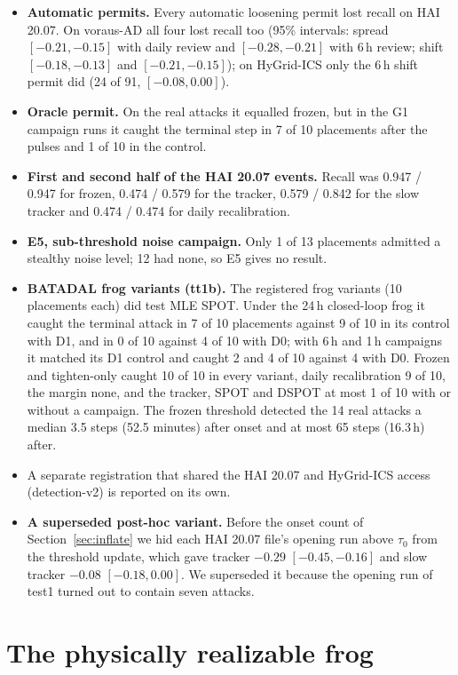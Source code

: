 \documentclass[sigconf,review,anonymous]{acmart}
\begin{document}
\begin{itemize}
\item \textbf{Automatic permits.} Every automatic loosening permit lost recall on HAI 20.07. On
  voraus-AD all four lost recall too (95\% intervals: spread $[-0.21, -0.15]$ with daily review and
  $[-0.28, -0.21]$ with 6\,h review; shift $[-0.18, -0.13]$ and $[-0.21, -0.15]$); on HyGrid-ICS only
  the 6\,h shift permit did (24 of 91, $[-0.08, 0.00]$).
\item \textbf{Oracle permit.} On the real attacks it equalled frozen, but in the G1 campaign runs it
  caught the terminal step in 7 of 10 placements after the pulses and 1 of 10 in the control.
\item \textbf{First and second half of the HAI 20.07 events.} Recall was 0.947 / 0.947 for frozen,
  0.474 / 0.579 for the tracker, 0.579 / 0.842 for the slow tracker and 0.474 / 0.474 for daily
  recalibration.
\item \textbf{E5, sub-threshold noise campaign.} Only 1 of 13 placements admitted a stealthy noise
  level; 12 had none, so E5 gives no result.
\item \textbf{BATADAL frog variants (tt1b).} The registered frog variants (10 placements each) did test MLE SPOT. Under the 24\,h closed-loop frog it caught the terminal attack in 7 of 10 placements against 9 of 10 in its control with D1, and in 0 of 10 against 4 of 10 with D0; with 6\,h and 1\,h campaigns it matched its D1 control and caught 2 and 4 of 10 against 4 with D0. Frozen and tighten-only caught 10 of 10 in every variant, daily recalibration 9 of 10, the margin none, and the tracker, SPOT and DSPOT at most 1 of 10 with or without a campaign. The frozen threshold detected the 14 real attacks a median 3.5 steps (52.5 minutes) after onset and at most 65 steps (16.3\,h) after.
\item A separate registration that shared the HAI 20.07 and HyGrid-ICS access (detection-v2) is reported
  on its own.
\item \textbf{A superseded post-hoc variant.} Before the onset count of Section~\ref{sec:inflate} we
  hid each HAI 20.07 file's opening run above $\tau_0$ from the threshold update, which gave tracker
  $-0.29$ $[-0.45, -0.16]$ and slow tracker $-0.08$ $[-0.18, 0.00]$. We superseded it because the
  opening run of test1 turned out to contain seven attacks.
\end{itemize}

\section{The physically realizable frog}
\label{app:physfrog}
\end{document}
